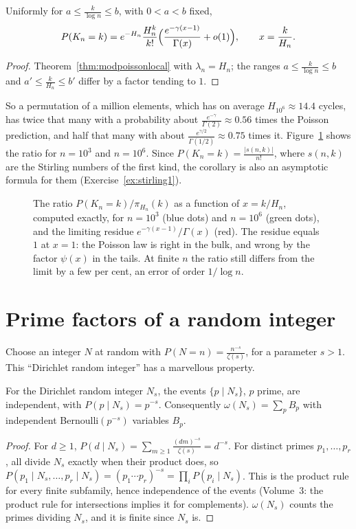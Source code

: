 \begin{corollary}\label{cor:cyclesdev}
Uniformly for $a\le\frac k{\log n}\le b$, with $0<a<b$ fixed,
\[
P(K_n=k)=e^{-H_n}\frac{H_n^k}{k!}\Bigl(\frac{e^{-\gamma(x-1)}}{\Gamma(x)}+o(1)\Bigr),\qquad x=\frac k{H_n}.
\]
\end{corollary}
\begin{proof}
Theorem~\ref{thm:modpoissonlocal} with $\lambda_n=H_n$; the ranges $a\le\frac k{\log n}\le b$ and $a'\le\frac k{H_n}\le b'$ differ by a factor tending to $1$.
\end{proof}

So a permutation of a million elements, which has on average $H_{10^6}\approx14.4$ cycles, has twice that many with a probability about $\frac{e^{-\gamma}}{\Gamma(2)}\approx0.56$ times the Poisson prediction, and half that many with
about $\frac{e^{\gamma/2}}{\Gamma(1/2)}\approx0.75$ times it. Figure~\ref{fig:cyclesratio} shows the ratio for $n=10^3$ and $n=10^6$. Since $P(K_n=k)=\frac{|s(n,k)|}{n!}$, where $s(n,k)$ are the Stirling numbers of the first kind, the corollary is
also an asymptotic formula for them (Exercise~\ref{ex:stirling1}).

\begin{figure}[ht]
\centering{}
\caption{The ratio $P(K_n=k)/\pi_{H_n}(k)$ as a function of $x=k/H_n$, computed exactly, for $n=10^3$ (blue dots) and $n=10^6$ (green dots), and the limiting residue $e^{-\gamma(x-1)}/\Gamma(x)$ (red). The residue equals $1$ at $x=1$: the
Poisson law is right in the bulk, and wrong by the factor $\psi(x)$ in the tails. At finite $n$ the ratio still differs from the limit by a few per cent, an error of order $1/\log n$.}
\label{fig:cyclesratio}
\end{figure}

\section{Prime factors of a random integer}

Choose an integer $N$ at random with $P(N=n)=\frac{n^{-s}}{\zeta(s)}$, for a parameter $s>1$. This ``Dirichlet random integer'' has a marvellous property.

\begin{proposition}\label{prop:dirichletint}
For the Dirichlet random integer $N_s$, the events $\{p\mid N_s\}$, $p$ prime, are independent, with $P(p\mid N_s)=p^{-s}$. Consequently $\omega(N_s)=\sum_pB_p$ with independent Bernoulli$(p^{-s})$ variables $B_p$.
\end{proposition}
\begin{proof}
For $d\ge1$, $P(d\mid N_s)=\sum_{m\ge1}\frac{(dm)^{-s}}{\zeta(s)}=d^{-s}$. For distinct primes $p_1,\dots,p_r$, all divide $N_s$ exactly when their product does, so $P(p_1\mid N_s,\dots,p_r\mid N_s)=(p_1\cdots p_r)^{-s}=\prod_iP(p_i\mid N_s)$. This is
the product rule for every finite subfamily, hence independence of the events (Volume~3: the product rule for intersections implies it for complements). $\omega(N_s)$ counts the primes dividing $N_s$, and it is finite since $N_s$ is.
\end{proof}


